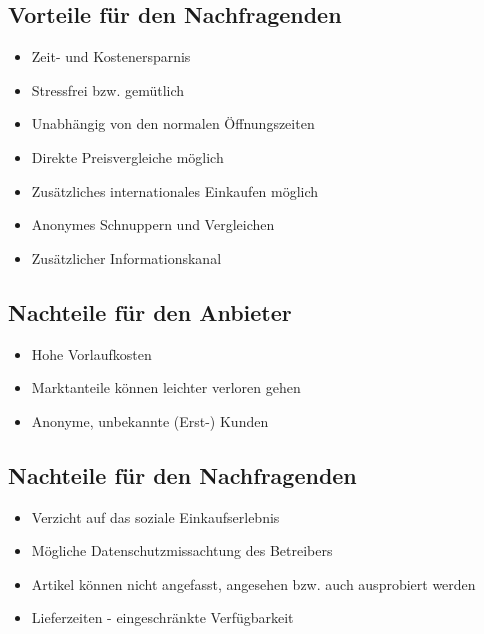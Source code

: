 \documentclass[a4paper]{article}
\begin{document}
\subsection{Vorteile für den Nachfragenden}
\begin{itemize}
\item Zeit- und Kostenersparnis
\item Stressfrei bzw. gemütlich
\item Unabhängig von den normalen Öffnungszeiten
\item Direkte Preisvergleiche möglich
\item Zusätzliches internationales Einkaufen möglich
\item Anonymes Schnuppern und Vergleichen
\item Zusätzlicher Informationskanal
\end{itemize}

\subsection{Nachteile für den Anbieter}
\begin{itemize}
\item Hohe Vorlaufkosten
\item Marktanteile können leichter verloren gehen
\item Anonyme, unbekannte (Erst-) Kunden
\end{itemize}

\subsection{Nachteile für den Nachfragenden}
\begin{itemize}
\item Verzicht auf das soziale Einkaufserlebnis
\item Mögliche Datenschutzmissachtung des Betreibers
\item Artikel können nicht angefasst, angesehen bzw. auch ausprobiert werden
\item Lieferzeiten - eingeschränkte Verfügbarkeit
\end{itemize}
\end{document}
